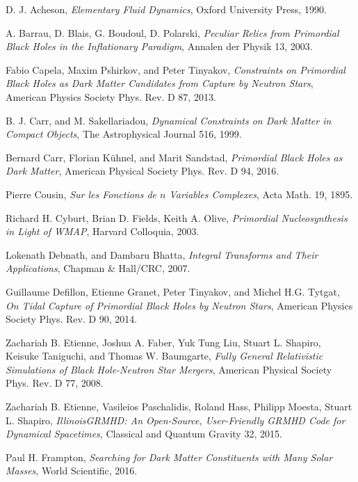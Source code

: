 \begin{thebibliography}{99}

D. J. Acheson, \emph{Elementary Fluid Dynamics}, Oxford University Press, 1990.

A. Barrau, D. Blais, G. Boudoul, D. Polarski, \emph{Peculiar Relics from Primordial Black Holes in the Inflationary Paradigm}, Annalen der Physik 13, 2003.

Fabio Capela, Maxim Pshirkov, and Peter Tinyakov, \emph{Constraints on Primordial Black Holes as Dark Matter Candidates from Capture by Neutron Stars}, American Physics Society Phys. Rev. D 87, 2013.

B. J. Carr, and M. Sakellariadou, \emph{Dynamical Constraints on Dark Matter in Compact Objects}, The Astrophysical Journal 516, 1999.

Bernard Carr, Florian K{\"u}hnel, and Marit Sandstad, \emph{Primordial Black Holes as Dark Matter}, American Physical Society Phys. Rev. D 94, 2016.

Pierre Cousin, \emph{Sur les Fonctions de $n$ Variables Complexes}, Acta Math. 19, 1895.

Richard H. Cyburt, Brian D. Fields, Keith A. Olive, \emph{Primordial Nucleosynthesis in Light of WMAP}, Harvard Colloquia, 2003.

Lokenath Debnath, and Dambaru Bhatta, \emph{Integral Transforms and Their Applications}, Chapman \& Hall/CRC, 2007.

Guillaume Defillon, Etienne Granet, Peter Tinyakov, and Michel H.G. Tytgat, \emph{On Tidal Capture of Primordial Black Holes by Neutron Stars}, American Physics Society Phys. Rev. D 90, 2014.

Zachariah B. Etienne, Joshua A. Faber, Yuk Tung Liu, Stuart L. Shapiro, Keisuke Taniguchi, and Thomas W. Baumgarte, \emph{Fully General Relativistic Simulations of Black Hole-Neutron Star Mergers}, American Physical Society Phys. Rev. D 77, 2008.

Zachariah B. Etienne, Vasileios Paschalidis, Roland Hass, Philipp Moesta, Stuart L. Shapiro, \emph{IllinoisGRMHD: An Open-Source, User-Friendly GRMHD Code for Dynamical Spacetimes}, Classical and Quantum Gravity 32, 2015.

Paul H. Frampton, \emph{Searching for Dark Matter Constituents with Many Solar Masses}, World Scientific, 2016.


\end{thebibliography}
